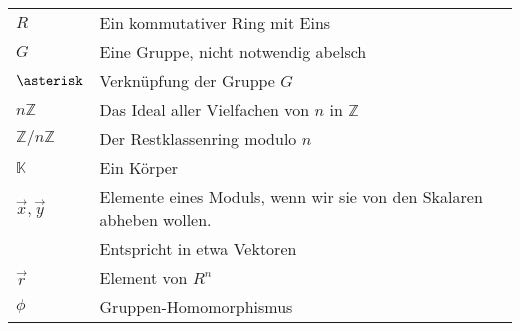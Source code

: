 \documentclass[a4paper]{amsart}
\theoremstyle{definition}
\newcommand{\Z}{\ensuremath{\mathbb{ Z }}}
\newcommand{\K}{\ensuremath{\mathbb{ K }}}
\newcommand{\zz}[1]{\ensuremath{\Z /#1\Z}}
\begin{document}
\renewcommand*{\arraystretch}{1}

\begin{tabular}{ll}
    $R$                                 & Ein kommutativer Ring mit Eins\\
    $G$                                 & Eine Gruppe, nicht notwendig abelsch\\
    $\asterisk$                         & Verknüpfung der Gruppe $G$\\
    $n\Z$                               & Das Ideal aller Vielfachen von $n$ in $\Z$\\
    $\zz{n}$                            & Der Restklassenring modulo $n$\\
    $\K$                                & Ein Körper\\
    $\vec x, \vec y$                    & Elemente eines Moduls, wenn wir sie von den Skalaren abheben wollen. \\
                                        & Entspricht in etwa Vektoren\\
    $\vec r$                            & Element von $R^n$\\
    $\phi$                              & Gruppen-Homomorphismus
    
\end{tabular}
\end{document}
